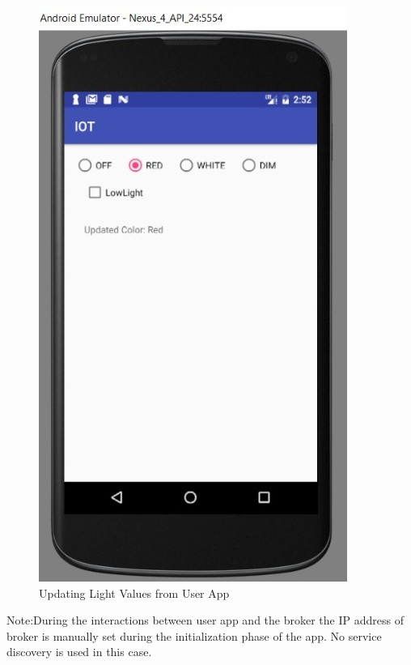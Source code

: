 \begin{figure}[h]
	\begin{center}
		\includegraphics[width=.7\linewidth]{img/androidapp}
		\caption{Updating Light Values from User App }
		\label{fig:fig4}
	\end{center}
\end{figure}



Note:During the interactions between user app and the broker the IP address of broker is manually set during the initialization phase of the app. No service discovery is used in this case.